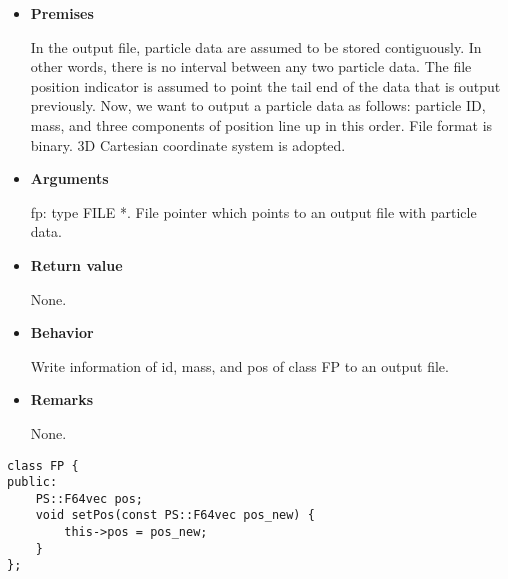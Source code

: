 \begin{itemize}

\item {\bf Premises}

  In the output file, particle data are assumed to be stored contiguously. In other words, there is no interval between any two particle data. The file position indicator is assumed to point the tail end of the data that is output previously. Now, we want to output a particle data as follows: particle ID, mass, and three components of position line up in this order. File format is binary. 3D Cartesian coordinate system is adopted.
  

\item {\bf Arguments}

  fp: type FILE *. File pointer which points to an output file with particle data.
  
\item {\bf Return value}

  None.
  
\item {\bf Behavior}

  Write information of id, mass, and pos of class FP to an output
  file.
  
\item {\bf Remarks}

  None.
  
\end{itemize}




\begin{screen}
\begin{verbatim}
class FP {
public:
    PS::F64vec pos;
    void setPos(const PS::F64vec pos_new) {
        this->pos = pos_new;
    }
};
\end{verbatim}
\end{screen}

